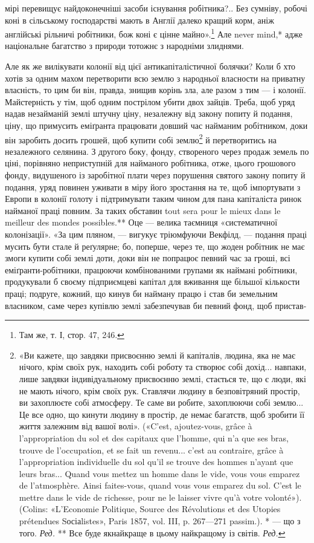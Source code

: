 мірі перевищує найдоконечніші засоби існування робітника?.. Без сумніву, робочі коні в сільському
господарстві мають в Англії далеко кращий корм, аніж англійські рільничі робітники, бож коні є цінне
майно».\footnote{
Там же, т. І, стор. 47, 246.
} Але never mind,* адже національне багатство з природи тотожнє з народніми злиднями.

Але як же вилікувати колонії від цієї антикапіталістичної болячки? Коли б хто хотів за одним махом
перетворити всю землю з народньої власности на приватну власність, то цим би він, правда, знищив
корінь зла, але разом з тим — і колонії. Майстерність у тім, щоб одним пострілом убити двох зайців.
Треба, щоб уряд надав незайманій землі штучну ціну, незалежну від закону попиту й подання, ціну, що
примусить еміґранта
працювати довший час найманим робітником, доки він заробить досить грошей, щоб купити собі землю\footnote{
«Ви кажете, що завдяки присвоєнню землі й капіталів, людина, яка не має нічого, крім своїх рук,
находить собі роботу та створює собі дохід... навпаки, лише завдяки індивідуальному присвоєнню
землі, стається те, що є люди, які не мають нічого, крім своїх рук. Ставлячи людину в безповітряний
простір, ви захоплюєте собі атмосферу. Те саме ви робите, захоплюючи собі землю... Це все одно, що
кинути людину в простір, де немає багатств, щоб зробити її життя залежним від вашої волі». («C’est,
ajoutez-vous, grâce à l’appropriation du sol et des capitaux que l’homme, qui n’a que ses bras,
trouve de l’occupation, et se fait un revenu... c’est au contraire, grâce à l’appropriation
individuelle du
sol qu’il se trouve des hommes n’ayant que leurs bras... Quand vous mettez un homme dans le vide,
vous vous emparez de l’atmosphère. Ainsi faites-vous, quand vous vous emparez du sol. C’est le
mettre dans le vide de richesse, pour ne le laisser vivre qu’à votre volonté»). (Colins: «L’Economie
Politique, Source des Révolutions et des Utopies prétendues Sосіаlistes», Paris 1857, vol. III, p.
267—271 passim.).
* — що з того. \emph{Ред.}
** Все буде якнайкраще в цьому найкращому із світів. \emph{Ред.}
}
й перетворитись на незалежного селянина. З другого боку, фонду, створеного через продаж земель по
ціні, порівняно неприступній для найманого робітника, отже, цього грошового фонду, видушеного із
заробітної плати через порушення святого закону попиту й подання, уряд повинен уживати в міру його
зростання на те, щоб імпортувати з Европи в колонії голоту і підтримувати таким
чином для пана капіталіста ринок найманої праці повним. За таких обставин tout sera pour le mieux
dans le meilleur des mondes possibles.** Оце — велика таємниця «систематичної колонізації». «За цим
пляном, — вигукує тріюмфуючи Векфілд, —
подання праці мусить бути стале й реґулярне; бо, поперше, через те, що жоден робітник не має змоги
купити собі землі доти, доки він не попрацює певний час за гроші, всі еміґранти-робітники, працюючи
комбінованими групами як наймані робітники, продукували б своєму підприємцеві капітал для вживання
ще більшої кількости праці; подруге, кожний, що кинув би найману працю і став би земельним
власником, саме через купівлю землі забезпечував би певний фонд, щоб пристав-